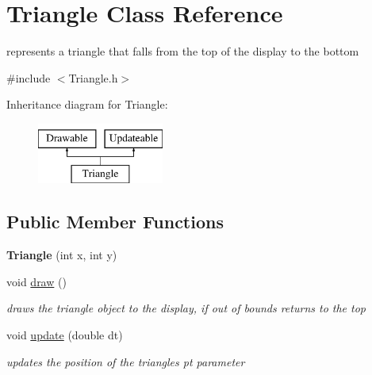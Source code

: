 \hypertarget{class_triangle}{}\section{Triangle Class Reference}
\label{class_triangle}


represents a triangle that falls from the top of the display to the bottom  




{\ttfamily \#include $<$Triangle.\+h$>$}

Inheritance diagram for Triangle\+:\begin{figure}[H]
\begin{center}
\leavevmode
\includegraphics[height=2.000000cm]{d2/d28/class_triangle}
\end{center}
\end{figure}
\subsection*{Public Member Functions}
\begin{DoxyCompactItemize}
\item 
\mbox{\label{class_triangle_afc6e6f7865d0dda26dd77682b2e29eeb}} 
{\bfseries Triangle} (int x, int y)
\item 
\mbox{\label{class_triangle_a43067ba4ee3c1d56930a567cc2186624}} 
void \mbox{\hyperlink{class_triangle_a43067ba4ee3c1d56930a567cc2186624}{draw}} ()
\begin{DoxyCompactList}\small\item\em draws the triangle object to the display, if out of bounds returns to the top \end{DoxyCompactList}\item 
void \mbox{\hyperlink{class_triangle_a38658aaef09315379d75dd9a36456c0e}{update}} (double dt)
\begin{DoxyCompactList}\small\item\em updates the position of the triangle\textquotesingle{}s pt parameter \end{DoxyCompactList}\end{DoxyCompactItemize}


